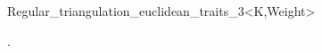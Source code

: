 \begin{ccRefClass}{Regular_triangulation_euclidean_traits_3<K,Weight>}


\ccSeeAlso

.

\end{ccRefClass}
